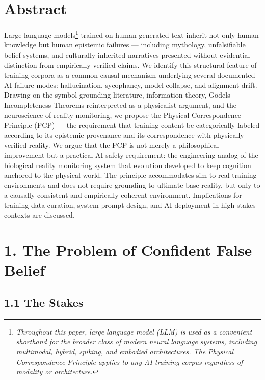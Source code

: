 \documentclass[
]{article}
\begin{document}
\section{\texorpdfstring{\textbf{Abstract}}{Abstract}}\label{abstract}

Large language models\footnote{\emph{Throughout this paper,
  \textquotesingle large language model\textquotesingle{} (LLM) is used
  as a convenient shorthand for the broader class of modern neural
  language systems, including multimodal, hybrid, spiking, and embodied
  architectures. The Physical Correspondence Principle applies to any AI
  training corpus regardless of modality or architecture.}} trained on
human-generated text inherit not only human knowledge but human
epistemic failures --- including mythology, unfalsifiable belief
systems, and culturally inherited narratives presented without
evidential distinction from empirically verified claims. We identify
this structural feature of training corpora as a common causal mechanism
underlying several documented AI failure modes: hallucination,
sycophancy, model collapse, and alignment drift. Drawing on the symbol
grounding literature, information theory, Gödel\textquotesingle s
Incompleteness Theorems reinterpreted as a physicalist argument, and the
neuroscience of reality monitoring, we propose the Physical
Correspondence Principle (PCP) --- the requirement that training content
be categorically labeled according to its epistemic provenance and its
correspondence with physically verified reality. We argue that the PCP
is not merely a philosophical improvement but a practical AI safety
requirement: the engineering analog of the biological reality monitoring
system that evolution developed to keep cognition anchored to the
physical world. The principle accommodates sim-to-real training
environments and does not require grounding to ultimate base reality,
but only to a causally consistent and empirically coherent environment.
Implications for training data curation, system prompt design, and AI
deployment in high-stakes contexts are discussed.

\section{1. The Problem of Confident False
Belief}\label{the-problem-of-confident-false-belief}

\subsection{1.1 The Stakes}\label{the-stakes}
\end{document}
